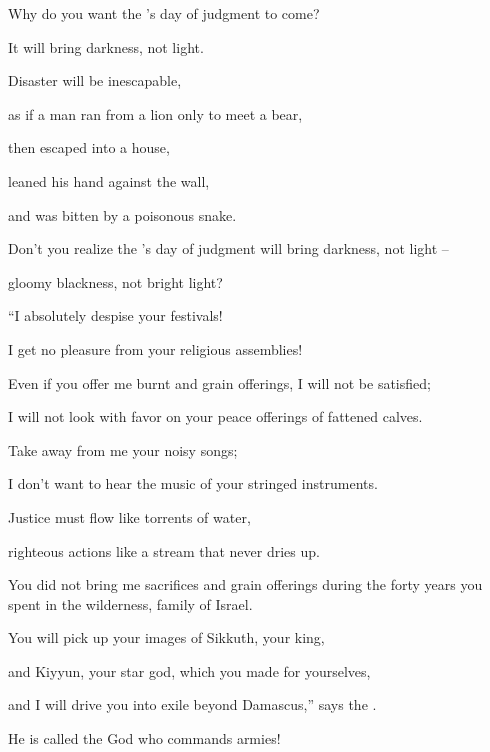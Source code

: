 {\par }{\Q Why
do you want
the
{}’s
day
of judgment to come?
\par }{\Q It will bring darkness,
not
light.
\par }{\Q {}Disaster will be inescapable,
\par }{\Q as if a man
ran from a lion
only to meet
a bear,
\par }{\Q then escaped
into a house,
\par }{\Q leaned
his hand
against
the wall,
\par }{\Q and was bitten
by a poisonous snake.
\par }{\Q {}Don’t
you realize the
{}’s
day
of judgment will bring darkness,
not
light
–
\par }{\Q gloomy
blackness, not
bright light?
\par }{\Q {}“I absolutely
despise
your festivals!
\par }{\Q I get no
pleasure from your religious
assemblies!
\par }{\Q {}Even
if
you offer
me burnt
and grain offerings,
I will not
be satisfied;
\par }{\Q I will not
look
with favor
on your peace offerings
of fattened calves.
\par }{\Q {}Take away
from me your noisy
songs;
\par }{\Q I don’t
want to hear
the music
of your stringed instruments.
\par }{\Q {}Justice
must flow like torrents
of water,
\par }{\Q righteous
actions like a stream
that never dries up.
\par }{\Q {}You did not bring me sacrifices
and grain offerings
during the forty
years
you spent in the wilderness,
family
of Israel.
\par }{\Q {}You will pick up
your images
of Sikkuth,
your king,
\par }{\Q and Kiyyun,
your star
god,
which
you made for yourselves,
\par }{\Q {}and I will drive you into exile
beyond
Damascus,”
says
the {}.
\par }{\Q He is called
the God
who commands armies!

\par }
